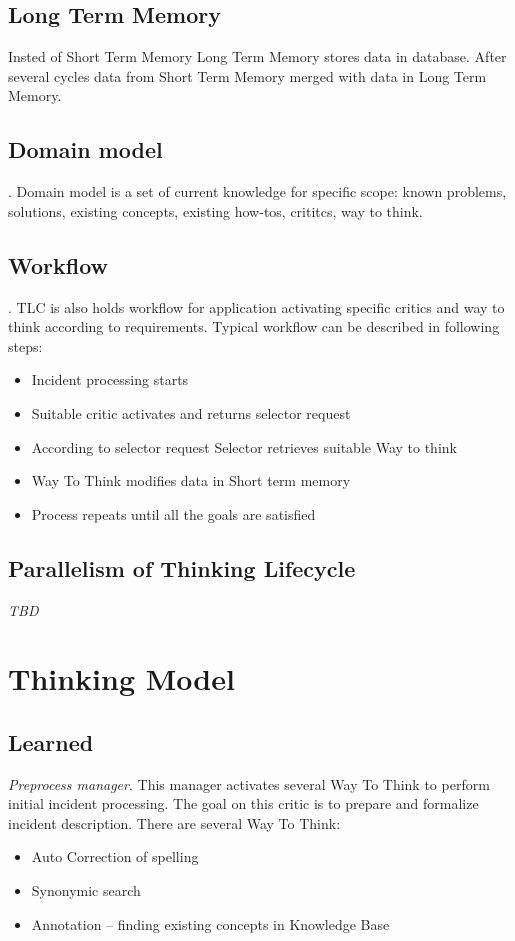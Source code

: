 \documentclass[12pt]{article}
\begin{document}
\subsection{Long Term Memory}
Insted of Short Term Memory Long Term Memory stores data in database. After several cycles data from Short Term Memory merged with data in Long Term Memory. 

\subsection{Domain model}. Domain model is a set of current knowledge for specific scope: known problems, solutions, existing concepts, existing how-tos, crititcs, way to think.\\

\subsection{Workflow}. TLC is also holds workflow for application activating specific critics and way to think according to requirements. Typical workflow can be described in following steps:

\begin{itemize}
 \item Incident processing starts
 \item Suitable critic activates and returns selector request
 \item According to selector request Selector retrieves suitable Way to think
 \item Way To Think modifies data in Short term memory
 \item Process repeats until all the goals are satisfied
\end{itemize}

\subsection{Parallelism of Thinking Lifecycle}

\emph{TBD}

\section{Thinking Model}

\subsection{Learned}

\emph{Preprocess manager}. This manager activates several Way To Think to perform initial incident processing. The goal on this critic is to prepare and formalize incident description. There are several Way To Think:
\begin{itemize}
 \item Auto Correction of spelling
 \item Synonymic search
 \item Annotation – finding existing concepts in Knowledge Base
\end{itemize}
\end{document}
